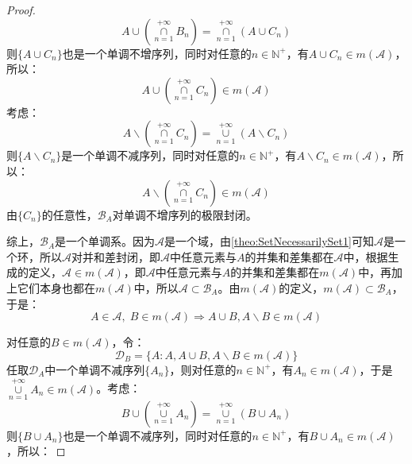 \begin{proof}
\begin{equation*}
		A\cup \left(\underset{n=1}{\overset{+\infty}{\cap}}B_n\right)
		=\underset{n=1}{\overset{+\infty}{\cap}}(A\cup C_n)
	\end{equation*}
	则$\{A\cup C_n\}$也是一个单调不增序列，同时对任意的$n\in\mathbb{N}^+$，有$A\cup C_n\in m(\mathscr{A})$，所以：
	\begin{equation*}
		A\cup\left(\underset{n=1}{\overset{+\infty}{\cap}}C_n\right)\in m(\mathscr{A})
	\end{equation*}
	考虑：
	\begin{equation*}
		A\backslash\left(\underset{n=1}{\overset{+\infty}{\cap}}C_n\right)
		=\underset{n=1}{\overset{+\infty}{\cup}}(A\backslash C_n)
	\end{equation*}
	则$\{A\backslash C_n\}$是一个单调不减序列，同时对任意的$n\in\mathbb{N}^+$，有$A\backslash C_n\in m(\mathscr{A})$，所以：
	\begin{equation*}
		A\backslash\left(\underset{n=1}{\overset{+\infty}{\cap}}C_n\right)\in m(\mathscr{A})
	\end{equation*}
	由$\{C_n\}$的任意性，$\mathscr{B}_A$对单调不增序列的极限封闭。\par
	综上，$\mathscr{B}_A$是一个单调系。因为$\mathscr{A}$是一个域，由\cref{theo:SetNecessarilySet1}可知$\mathscr{A}$是一个环，所以$\mathscr{A}$对并和差封闭，即$\mathscr{A}$中任意元素与$A$的并集和差集都在$\mathscr{A}$中，根据生成的定义，$\mathscr{A}\in m(\mathscr{A})$，即$\mathscr{A}$中任意元素与$A$的并集和差集都在$m(\mathscr{A})$中，再加上它们本身也都在$m(\mathscr{A})$中，所以$\mathscr{A}\subset \mathscr{B}_A$。由$m(\mathscr{A})$的定义，$m(\mathscr{A})\subset \mathscr{B}_A$，于是：
	\begin{equation*}
		A\in \mathscr{A},\;B\in m(\mathscr{A})\Rightarrow A\cup B,A\backslash B\in m(\mathscr{A})
	\end{equation*}\par
	对任意的$B\in m(\mathscr{A})$，令：
	\begin{equation*}
		\mathscr{D}_B=\{A:A,A\cup B,A\backslash B\in m(\mathscr{A})\}
	\end{equation*}
	任取$\mathscr{D}_A$中一个单调不减序列$\{A_n\}$，则对任意的$n\in\mathbb{N}^+$，有$A_n\in m(\mathscr{A})$，于是$\underset{n=1}{\overset{+\infty}{\cup}}A_n\in m(\mathscr{A})$。考虑：
	\begin{equation*}
		B\cup \left(\underset{n=1}{\overset{+\infty}{\cup}}A_n\right)
		=\underset{n=1}{\overset{+\infty}{\cup}}(B\cup A_n)
	\end{equation*}
	则$\{B\cup A_n\}$也是一个单调不减序列，同时对任意的$n\in\mathbb{N}^+$，有$B\cup A_n\in m(\mathscr{A})$，所以：

\end{proof}
